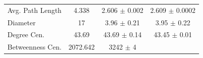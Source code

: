 \documentclass[12pt,twoside]{amherstthesis}
\begin{document}
\begin{longtable}[]{@{}lccc@{}}
\begin{minipage}[t]{0.18\columnwidth}
  Avg. Path Length\strut
  \end{minipage} & \begin{minipage}[t]{0.13\columnwidth}\centering\strut
  4.338\strut
  \end{minipage} & \begin{minipage}[t]{0.29\columnwidth}\centering\strut
  2.606 \(\pm\) 0.002\strut
  \end{minipage} & \begin{minipage}[t]{0.29\columnwidth}\centering\strut
  2.609 \(\pm\) 0.0002\strut
  \end{minipage}\tabularnewline
  \begin{minipage}[t]{0.18\columnwidth}\raggedright\strut
  Diameter\strut
  \end{minipage} & \begin{minipage}[t]{0.13\columnwidth}\centering\strut
  17\strut
  \end{minipage} & \begin{minipage}[t]{0.29\columnwidth}\centering\strut
  3.96 \(\pm\) 0.21\strut
  \end{minipage} & \begin{minipage}[t]{0.29\columnwidth}\centering\strut
  3.95 \(\pm\) 0.22\strut
  \end{minipage}\tabularnewline
  \begin{minipage}[t]{0.18\columnwidth}\raggedright\strut
  Degree Cen.\strut
  \end{minipage} & \begin{minipage}[t]{0.13\columnwidth}\centering\strut
  43.69\strut
  \end{minipage} & \begin{minipage}[t]{0.29\columnwidth}\centering\strut
  43.69 \(\pm\) 0.14\strut
  \end{minipage} & \begin{minipage}[t]{0.29\columnwidth}\centering\strut
  43.45 \(\pm\) 0.01\strut
  \end{minipage}\tabularnewline
  \begin{minipage}[t]{0.18\columnwidth}\raggedright\strut
  Betweenness Cen.\strut
  \end{minipage} & \begin{minipage}[t]{0.13\columnwidth}\centering\strut
  2072.642\strut
  \end{minipage} & \begin{minipage}[t]{0.29\columnwidth}\centering\strut
  3242 \(\pm\) 4\strut
  \end{minipage} & \begin{minipage}[t]{0.29\columnwidth}\centering\strut

\end{minipage}
\end{longtable}
\end{document}
